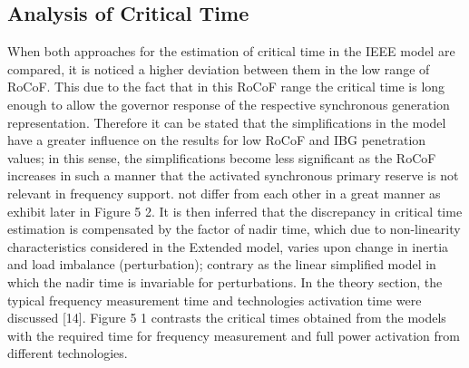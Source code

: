 
\subsection{Analysis of Critical Time}


When both approaches for the estimation of critical time in the IEEE model are compared, it is noticed a higher deviation between them in the low range of RoCoF. This due to the fact that in this RoCoF range
the critical time is long enough to allow the governor response of the respective synchronous generation representation. Therefore it can be stated that the simplifications in the model
have a greater influence on the results for low RoCoF and IBG penetration values; in this sense, the simplifications become less significant as the RoCoF increases in such a manner
that the activated synchronous primary reserve is not relevant in frequency support.
not differ from each other in a great manner as exhibit later in Figure 5 2. It is then inferred that the discrepancy in critical time estimation is compensated by the factor of
nadir time, which due to non-linearity characteristics considered in the Extended model, varies upon change in inertia and load imbalance (perturbation); contrary as the linear
simplified model in which the nadir time is invariable for perturbations.
In the theory section, the typical frequency measurement time and technologies activation time were discussed [14]. Figure 5 1 contrasts the critical times obtained from the
models with the required time for frequency measurement and full power activation from different technologies.


